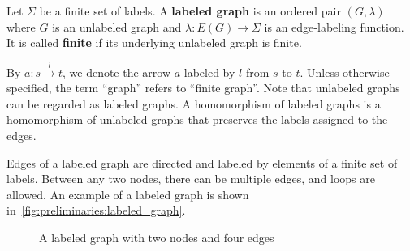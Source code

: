 \begin{definition}
    \label{def:graph}
    Let \(\Sigma\) be a finite set of labels. A \textbf{labeled graph} is an ordered pair \((G,\lambda)\) where \( G \) is an unlabeled graph and \( \lambda : E(G) \rightarrow \Sigma\) is an edge-labeling function. 
    It is called \textbf{finite} if its underlying unlabeled graph is finite.  
\end{definition}
By $a : s\overset{l}{\rightarrow} t$, we denote the arrow $a$ labeled by $l$ from $s$ to $t$. Unless otherwise specified, the term \enquote{graph} refers to \enquote{finite graph}. Note that unlabeled graphs can be regarded as labeled graphs. A homomorphism of labeled graphs is a homomorphism of unlabeled graphs that preserves the labels assigned to the edges.
\begin{example}
    Edges of a labeled graph are directed and labeled by elements of a finite set of labels. Between any two nodes, there can be multiple edges, and loops are allowed. An example of a labeled graph is shown in~\autoref{fig:preliminaries:labeled_graph}.
    \begin{figure}[hbtp]
       \centering
        \caption{A labeled graph with two nodes and four edges}
        \label{fig:preliminaries:labeled_graph}
    \end{figure}

\end{example}